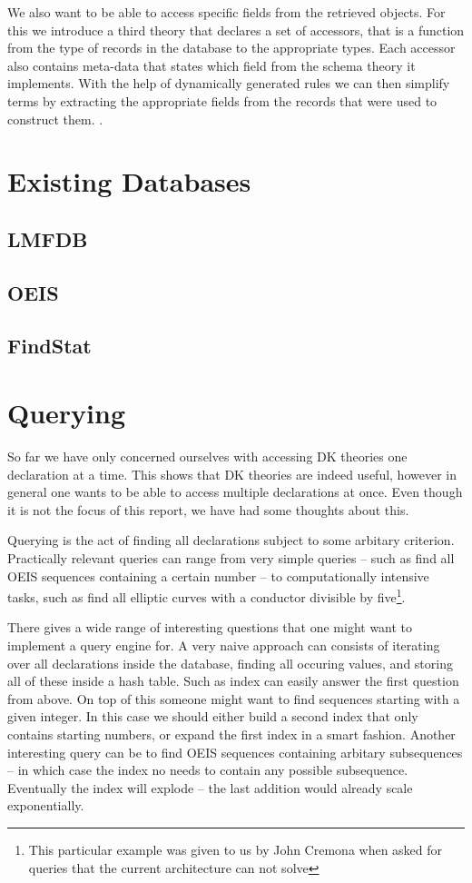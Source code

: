 \documentclass{deliverablereport}
\begin{document}
We also want to be able to access specific fields from the retrieved objects. For this we introduce a third theory that declares a set of accessors, that is a function from the type of records in the database to the appropriate types. Each accessor also contains meta-data that states which field from the schema theory it implements. With the help of dynamically generated rules we can then simplify terms by extracting the appropriate fields from the records that were used to construct them. .


\section{Existing Databases}\label{sec:lmfdb}

\subsection{LMFDB}
\subsection{OEIS}
\subsection{FindStat}

\section{Querying}

So far we have only concerned ourselves with accessing DK theories one declaration at a time. This shows that DK theories are indeed useful, however in general one wants to be able to access multiple declarations at once. Even though it is not the focus of this report, we have had some thoughts about this.

Querying is the act of finding all declarations subject to some arbitary criterion. Practically relevant queries can range from very simple queries -- such as find all OEIS sequences containing a certain number -- to computationally intensive tasks, such as find all elliptic curves with a conductor divisible by five\footnote{This particular example was given to us by John Cremona when asked for queries that the current architecture can not solve}.

There gives a wide range of interesting questions that one might want to implement a query engine for. A very naive approach can consists of iterating over all declarations inside the database, finding all occuring values, and storing all of these inside a hash table. Such as index can easily answer the first question from above. On top of this someone might want to find sequences starting with a given integer. In this case we should either build a second index that only contains starting numbers, or expand the first index in a smart fashion. Another interesting query can be to find OEIS sequences containing arbitary subsequences -- in which case the index no needs to contain any possible subsequence. Eventually the index will explode -- the last addition would already scale exponentially.
\end{document}
